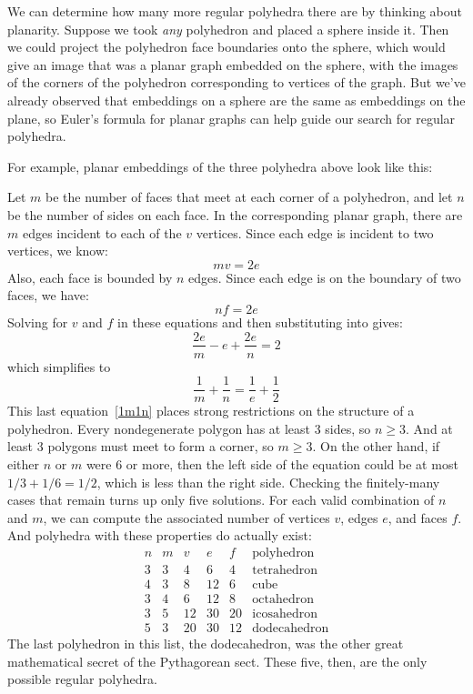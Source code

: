
We can determine how many more regular polyhedra there are by thinking
about planarity.  Suppose we took \emph{any} polyhedron and placed a
sphere inside it.  Then we could project the polyhedron face boundaries
onto the sphere, which would give an image that was a planar graph
embedded on the sphere, with the images of the corners of the polyhedron
corresponding to vertices of the graph.  But we've already observed that
embeddings on a sphere are the same as embeddings on the plane, so Euler's
formula for planar graphs can help guide our search for regular polyhedra.

For example, planar embeddings of the three polyhedra above look like
this:

\begin{center}

\end{center}

Let $m$ be the number of faces that meet at each corner of a
polyhedron, and let $n$ be the number of sides on each face.  In the
corresponding planar graph, there are $m$ edges incident to each of
the $v$ vertices.  Since each edge is incident to two vertices, we
know:
%
\[
m v = 2 e
\]
%
Also, each face is bounded by $n$ edges.  Since each edge is on the
boundary of two faces, we have:
%
\[
n f = 2 e
\]
%
Solving for $v$ and $f$ in these equations and then substituting into
 gives:
\[
\frac{2e}{m} - e + \frac{2e}{n} = 2
\]
which simplifies to
\begin{equation}\label{1m1n}
\frac{1}{m} + \frac{1}{n} = \frac{1}{e} + \frac{1}{2}
\end{equation}
%
This last equation~\eqref{1m1n} places strong restrictions on the
structure of a polyhedron.  Every nondegenerate polygon has at least 3
sides, so $n \geq 3$.  And at least 3 polygons must meet to form a corner,
so $m \geq 3$.  On the other hand, if either $n$ or $m$ were 6 or more,
then the left side of the equation could be at most $1/3 + 1/6 = 1/2$,
which is less than the right side.  Checking the finitely-many cases that
remain turns up only five solutions.  For each valid combination of $n$
and $m$, we can compute the associated number of vertices $v$, edges $e$,
and faces $f$.  And polyhedra with these properties do actually exist:
%
\[
\begin{array}{cc|ccc|l}
n & m & v  & e  &  f & \text{polyhedron} \\ \hline
3 & 3 & 4  & 6  &  4 & \text{tetrahedron} \\
4 & 3 & 8  & 12 &  6 & \text{cube} \\
3 & 4 & 6  & 12 &  8 & \text{octahedron} \\
3 & 5 & 12 & 30 & 20 & \text{icosahedron} \\
5 & 3 & 20 & 30 & 12 & \text{dodecahedron}
\end{array}
\]
%
The last polyhedron in this list, the dodecahedron, was the other great
mathematical secret of the Pythagorean sect.  These five, then, are the
only possible regular polyhedra.

